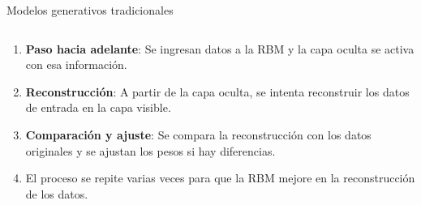 \begin{frame}{Modelos generativos tradicionales}
\begin{columns}
        \scriptsize{
        \begin{column}{0.6\textwidth}
            \begin{enumerate}
                \item \textbf{Paso hacia adelante}: Se ingresan datos a la RBM y la capa oculta se activa con esa información.
                \item \textbf{Reconstrucción}: A partir de la capa oculta, se intenta reconstruir los datos de entrada en la capa visible.
                \item \textbf{Comparación y ajuste}: Se compara la reconstrucción con los datos originales y se ajustan los pesos si hay diferencias.
                \item El proceso se repite varias veces para que la RBM mejore en la reconstrucción de los datos.
            \end{enumerate}
        \end{column}
        }
    \end{columns}
    
\end{frame}


